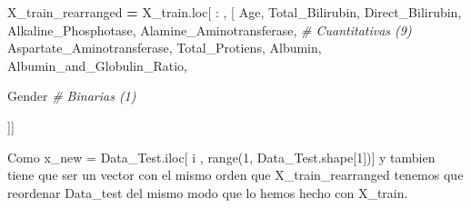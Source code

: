 \documentclass[
  11pt,
  a4paper,
]{article}
\newenvironment{Shaded}{\begin{snugshade}}{\end{snugshade}}
\newcommand{\CommentTok}[1]{\textcolor[rgb]{0.56,0.35,0.01}{\textit{#1}}}
\newcommand{\NormalTok}[1]{#1}
\newcommand{\OperatorTok}[1]{\textcolor[rgb]{0.81,0.36,0.00}{\textbf{#1}}}
\newcommand{\StringTok}[1]{\textcolor[rgb]{0.31,0.60,0.02}{#1}}
\begin{document}
\begin{Shaded}
\begin{Highlighting}[]
\NormalTok{X\_train\_rearranged }\OperatorTok{=}\NormalTok{ X\_train.loc[ : , [  }\StringTok{\textquotesingle{}Age\textquotesingle{}}\NormalTok{, }\StringTok{\textquotesingle{}Total\_Bilirubin\textquotesingle{}}\NormalTok{, }\StringTok{\textquotesingle{}Direct\_Bilirubin\textquotesingle{}}\NormalTok{,}
                                         \StringTok{\textquotesingle{}Alkaline\_Phosphotase\textquotesingle{}}\NormalTok{, }\StringTok{\textquotesingle{}Alamine\_Aminotransferase\textquotesingle{}}\NormalTok{,          }\CommentTok{\# Cuantitativas (9)}
                                         \StringTok{\textquotesingle{}Aspartate\_Aminotransferase\textquotesingle{}}\NormalTok{, }\StringTok{\textquotesingle{}Total\_Protiens\textquotesingle{}}\NormalTok{, }\StringTok{\textquotesingle{}Albumin\textquotesingle{}}\NormalTok{,}
                                         \StringTok{\textquotesingle{}Albumin\_and\_Globulin\_Ratio\textquotesingle{}}\NormalTok{,}
    
                                         \StringTok{\textquotesingle{}Gender\textquotesingle{}}   \CommentTok{\# Binarias (1)}

\NormalTok{                                       ]]}
\end{Highlighting}
\end{Shaded}

Como x\_new = Data\_Test.iloc{[} i , range(1,
Data\_Test.shape{[}1{]}){]} y tambien tiene que ser un vector con el
mismo orden que X\_train\_rearranged tenemos que reordenar Data\_test
del mismo modo que lo hemos hecho con X\_train.
\end{document}
